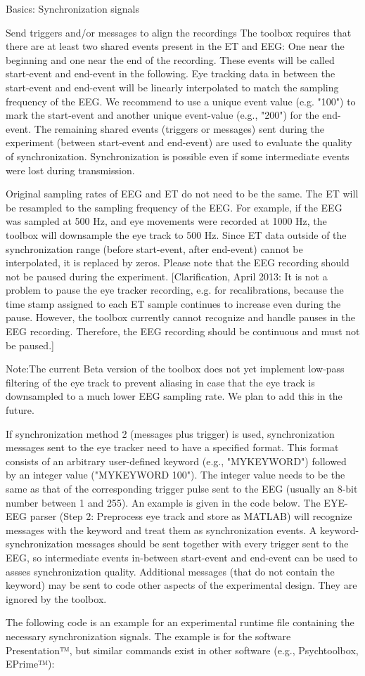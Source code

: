      Basics: Synchronization signals

     Send triggers and/or messages to align the recordings
The toolbox requires that there are at least two shared events present in the ET and EEG: One near the beginning and one near the end of the recording. These events will be called start-event and end-event in the following. Eye tracking data in between the start-event and end-event will be linearly interpolated to match the sampling frequency of the EEG. We recommend to use a unique event value (e.g. "100") to mark the start-event and another unique event-value (e.g., "200") for the end-event. The remaining shared events (triggers or messages) sent during the experiment (between start-event and end-event) are used to evaluate the quality of synchronization. Synchronization is possible even if some intermediate events were lost during transmission.

Original sampling rates of EEG and ET do not need to be the same. The ET will be resampled to the sampling frequency of the EEG. For example, if the EEG was sampled at 500 Hz, and eye movements were recorded at 1000 Hz, the toolbox will downsample the eye track to 500 Hz. Since ET data outside of the synchronization range (before start-event, after end-event) cannot be interpolated, it is replaced by zeros. Please note that the EEG recording should not be paused during the experiment. [Clarification, April 2013: It is not a problem to pause the eye tracker recording, e.g. for recalibrations, because the time stamp assigned to each ET sample continues to increase even during the pause. However, the toolbox currently cannot recognize and handle pauses in the EEG recording. Therefore, the EEG recording should be continuous and must not be paused.]

Note:The current Beta version of the toolbox does not yet implement low-pass filtering of the eye track to prevent aliasing in case that the eye track is downsampled to a much lower EEG sampling rate. We plan to add this in the future.

If synchronization method 2 (messages plus trigger) is used, synchronization messages sent to the eye tracker need to have a specified format. This format consists of an arbitrary user-defined keyword (e.g., "MYKEYWORD") followed by an integer value ("MYKEYWORD 100"). The integer value needs to be the same as that of the corresponding trigger pulse sent to the EEG (usually an 8-bit number between 1 and 255). An example is given in the code below. The EYE-EEG parser (Step 2: Preprocess eye track and store as MATLAB) will recognize messages with the keyword and treat them as synchronization events. A keyword-synchronization messages should be sent together with every trigger sent to the EEG, so intermediate events in-between start-event and end-event can be used to assses synchronization quality. Additional messages (that do not contain the keyword) may be sent to code other aspects of the experimental design. They are ignored by the toolbox.

The following code is an example for an experimental runtime file containing the necessary synchronization signals. The example is for the software Presentation™, but similar commands exist in other software (e.g., Psychtoolbox, EPrime™):